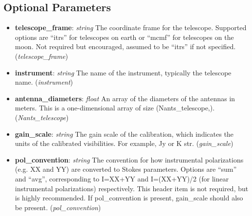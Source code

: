 \documentclass[11pt, oneside]{article}
\begin{document}
\subsection{Optional Parameters}
\label{sec:opt_params}
\begin{itemize}
\item \textbf{telescope\_frame}: \textit{string}  The coordinate frame for the telescope.
  Supported options are ``itrs'' for telescopes on earth or ``mcmf'' for telescopes
  on the moon. Not required but encouraged, assumed to be ``itrs'' if not specified.
  (\textit{telescope\_frame})
\item \textbf{instrument}: \textit{string} The name of the instrument, typically
  the telescope name. (\textit{instrument})
\item \textbf{antenna\_diameters}: \textit{float} An array of the diameters of
  the antennas in meters. This is a one-dimensional array of size
  (Nants\_telescope,). (\textit{Nants\_telescope})

\item \textbf{gain\_scale}: \textit{string}  The gain scale of the calibration, which
  indicates the units of the calibrated visibilities. For example, Jy or K str.
  (\textit{gain\_scale})
\item \textbf{pol\_convention}: \textit{string} The convention for how instrumental
  polarizations (e.g. XX and YY) are converted to Stokes parameters. Options are
  ``sum'' and ``avg'', corresponding to I=XX+YY and I=(XX+YY)/2 (for linear
  instrumental polarizations) respectively. This header item is not required, but is
  highly recommended. If pol\_convention is present, gain\_scale should also be
  present. (\textit{pol\_convention})


\end{itemize}
\end{document}
